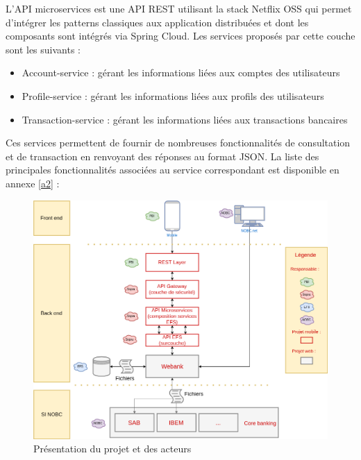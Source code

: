 	L'API microservices est une API REST utilisant la stack Netflix OSS qui permet d'intégrer les patterns classiques aux application distribuées et dont les composants sont intégrés via Spring Cloud. Les services proposés par cette couche sont les suivants :\\

\begin{itemize}
			\item Account-service : gérant les informations liées aux comptes des utilisateurs
			\item Profile-service : gérant les informations liées aux profils des utilisateurs
			\item Transaction-service : gérant les informations liées aux transactions bancaires \\
\end{itemize}

	Ces services permettent de fournir de nombreuses fonctionnalités de consultation et de transaction en renvoyant des réponses au format JSON. La liste des principales fonctionnalités associées au service correspondant est disponible en annexe \ref{a2} :
	
\begin{figure}[H]
\raggedleft
	\includegraphics[scale=0.45]{images/travailNeuflizeOBC/architecture/archiFonc.png}
	\centering
	\caption{Présentation du projet et des acteurs}
	\label{archiFonc}
\end{figure}